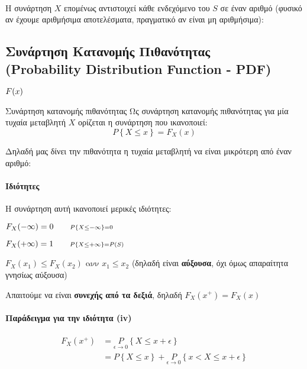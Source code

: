 \documentclass[11pt,a4paper,notitlepage,fleqn,final]{article}
\begin{document}
	\paragraph{}
	
	Η συνάρτηση \( X \) επομένως αντιστοιχεί κάθε ενδεχόμενο του \( S \)
	σε έναν αριθμό (φυσικό αν έχουμε αριθμήσιμα αποτελέσματα, πραγματικό
	αν είναι μη αριθμήσιμα):
	
	\subsection[Συνάρτηση Κατανομής Πιθανότητας]{
		Συνάρτηση Κατανομής Πιθανότητας \\ (Probability Distribution
		Function - PDF)}
	\( \mathlarger{F(x)} \)
	
	\begin{defn}{Συνάρτηση κατανομής πιθανότητας}{}
	Ως συνάρτηση κατανομής πιθανότητας για μία τυχαία μεταβλητή \( X \)
	ορίζεται η συνάρτηση που ικανοποιεί:
	\[
	P\left\lbrace X \leq x \right\rbrace = F_X(x)
	\]
	\end{defn}
	
	Δηλαδή μας δίνει την πιθανότητα η τυχαία μεταβλητή να είναι 
	μικρότερη από έναν αριθμό:
	
	\paragraph{Ιδιότητες}
	Η συνάρτηση αυτή ικανοποιεί μερικές ιδιότητες:
	\begin{enumroman}
		\item \( F_X(-\infty) = 0 \qquad
		\mathsmaller{P\left\lbrace X\leq-\infty \right\rbrace = 0} \)
		\item \( F_X(+\infty) = 1 \qquad 
		\mathsmaller{P\left\lbrace X\leq+\infty \right\rbrace = P(S)}\)
		\item \( F_X(x_1) \leq F_X(x_2) \text{ ανν } x_1 \leq x_2 \)
		(δηλαδή είναι \textbf{αύξουσα}, όχι όμως απαραίτητα γνησίως αύξουσα)
		\item Απαιτούμε να είναι \textbf{συνεχής από τα δεξιά}, δηλαδή
		\( F_X(x^+) = F_X(x) \)
	\end{enumroman}
	
	\paragraph{Παράδειγμα για την ιδιότητα (iv)}
	\begin{align*}
		F_X(x^+) &= \underset{\epsilon\to 0}{P}
		\left\lbrace X \leq x+\epsilon \right\rbrace
		\\ &= P\left\lbrace X \leq x \right\rbrace
		+ \underset{\epsilon\to 0}{P}\left\lbrace x<X\leq x+\epsilon
		 \right\rbrace
	\end{align*}
	
\end{document}
